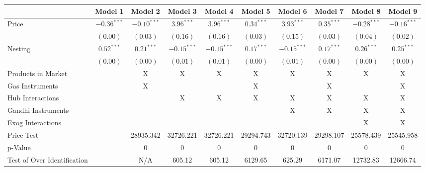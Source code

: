 
\begin{tabular}{l c c c c c c c c c}
\toprule
 & Model 1 & Model 2 & Model 3 & Model 4 & Model 5 & Model 6 & Model 7 & Model 8 & Model 9 \\
\midrule
Price                       & $-0.36^{***}$ & $-0.10^{***}$ & $3.96^{***}$  & $3.96^{***}$  & $0.34^{***}$ & $3.93^{***}$  & $0.35^{***}$ & $-0.28^{***}$ & $-0.16^{***}$ \\
                            & $(0.00)$      & $(0.03)$      & $(0.16)$      & $(0.16)$      & $(0.03)$     & $(0.15)$      & $(0.03)$     & $(0.04)$      & $(0.02)$      \\
Nesting                     & $0.52^{***}$  & $0.21^{***}$  & $-0.15^{***}$ & $-0.15^{***}$ & $0.17^{***}$ & $-0.15^{***}$ & $0.17^{***}$ & $0.26^{***}$  & $0.25^{***}$  \\
                            & $(0.00)$      & $(0.00)$      & $(0.01)$      & $(0.01)$      & $(0.00)$     & $(0.01)$      & $(0.00)$     & $(0.00)$      & $(0.00)$      \\
\midrule
Products in Market          &               & X             & X             & X             & X            & X             & X            & X             & X             \\
Gas Instruments             &               & X             &               &               & X            &               & X            &               & X             \\
Hub Interactions            &               &               & X             & X             & X            & X             & X            & X             & X             \\
Gandhi Instruments          &               &               &               &               &              & X             & X            & X             & X             \\
Exog Interactions           &               &               &               &               &              &               &              & X             & X             \\
Price Test                  &               & 28935.342     & 32726.221     & 32726.221     & 29294.743    & 32720.139     & 29298.107    & 25578.439     & 25545.958     \\
p-Value                     &               & 0             & 0             & 0             & 0            & 0             & 0            & 0             & 0             \\
Test of Over Identification &               & N/A           & 605.12        & 605.12        & 6129.65      & 625.29        & 6171.07      & 12732.83      & 12666.74      \\

\end{tabular}

